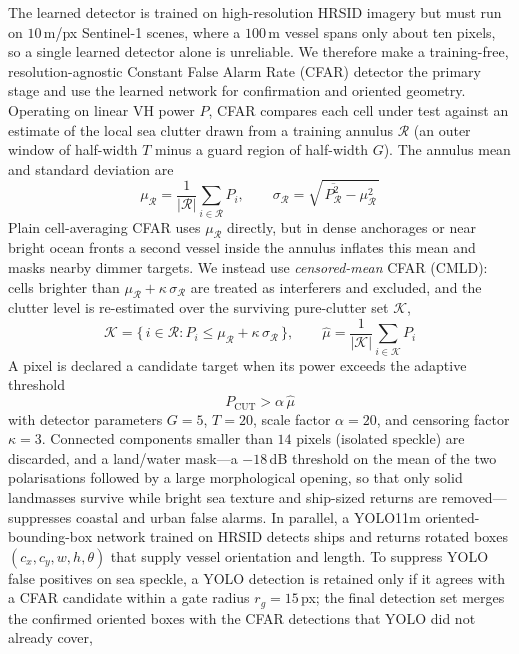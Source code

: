 \documentclass{ieeeaccess}
\begin{document}
The learned detector is trained on high-resolution HRSID imagery but must run on $10$\,m/px Sentinel-1 scenes, where a $100$\,m vessel spans only about ten pixels, so a single learned detector alone is unreliable. We therefore make a training-free, resolution-agnostic Constant False Alarm Rate (CFAR) detector the primary stage and use the learned network for confirmation and oriented geometry. Operating on linear VH power $P$, CFAR compares each cell under test against an estimate of the local sea clutter drawn from a training annulus $\mathcal{R}$ (an outer window of half-width $T$ minus a guard region of half-width $G$). The annulus mean and standard deviation are
\begin{equation}
\mu_{\mathcal{R}} = \frac{1}{|\mathcal{R}|}\sum_{i\in\mathcal{R}} P_i,
\qquad
\sigma_{\mathcal{R}} = \sqrt{\,\overline{P^2_{\mathcal{R}}} - \mu_{\mathcal{R}}^2\,}
\label{eq:ringstats}
\end{equation}
Plain cell-averaging CFAR uses $\mu_{\mathcal{R}}$ directly, but in dense anchorages or near bright ocean fronts a second vessel inside the annulus inflates this mean and masks nearby dimmer targets. We instead use \emph{censored-mean} CFAR (CMLD): cells brighter than $\mu_{\mathcal{R}}+\kappa\,\sigma_{\mathcal{R}}$ are treated as interferers and excluded, and the clutter level is re-estimated over the surviving pure-clutter set $\mathcal{K}$,
\begin{equation}
\mathcal{K} = \{\,i\in\mathcal{R} : P_i \le \mu_{\mathcal{R}} + \kappa\,\sigma_{\mathcal{R}}\,\},
\qquad
\hat{\mu} = \frac{1}{|\mathcal{K}|}\sum_{i\in\mathcal{K}} P_i
\label{eq:censor}
\end{equation}
A pixel is declared a candidate target when its power exceeds the adaptive threshold
\begin{equation}
P_{\text{CUT}} > \alpha\,\hat{\mu}
\label{eq:cfarthresh}
\end{equation}
with detector parameters $G=5$, $T=20$, scale factor $\alpha=20$, and censoring factor $\kappa=3$. Connected components smaller than $14$ pixels (isolated speckle) are discarded, and a land/water mask---a $-18$\,dB threshold on the mean of the two polarisations followed by a large morphological opening, so that only solid landmasses survive while bright sea texture and ship-sized returns are removed---suppresses coastal and urban false alarms. In parallel, a YOLO11m oriented-bounding-box network trained on HRSID detects ships and returns rotated boxes $(c_x,c_y,w,h,\theta)$ that supply vessel orientation and length. To suppress YOLO false positives on sea speckle, a YOLO detection is retained only if it agrees with a CFAR candidate within a gate radius $r_g=15$\,px; the final detection set merges the confirmed oriented boxes with the CFAR detections that YOLO did not already cover,
\end{document}
